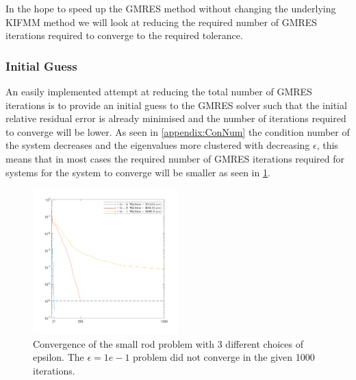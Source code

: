 In the hope to speed up the GMRES method without changing the underlying KIFMM method we will look at reducing the required number of GMRES iterations required to converge to the required tolerance.

\subsubsection{Initial Guess}\label{sec:Guess}

An easily implemented attempt at reducing the total number of GMRES iterations is to provide an initial guess to the GMRES solver such that the initial relative residual error is already minimised and the number of iterations required to converge will be lower. As seen in \cref{appendix:ConNum} the condition number of the system decreases and the eigenvalues more clustered with decreasing $\epsilon$, this means that in most cases the required number of GMRES iterations required for systems for the system to converge will be smaller as seen in \cref{fig:InitalGuessEPS}.
\begin{figure}[ht]
    \centering
    \includegraphics[width=0.5\textwidth]{Images/InitalGuessEPS.pdf}
    \caption{Convergence of the small rod problem with 3 different choices of epsilon. The $\epsilon = 1e-1$ problem did not converge in the given 1000 iterations.}
    \label{fig:InitalGuessEPS}
\end{figure}
